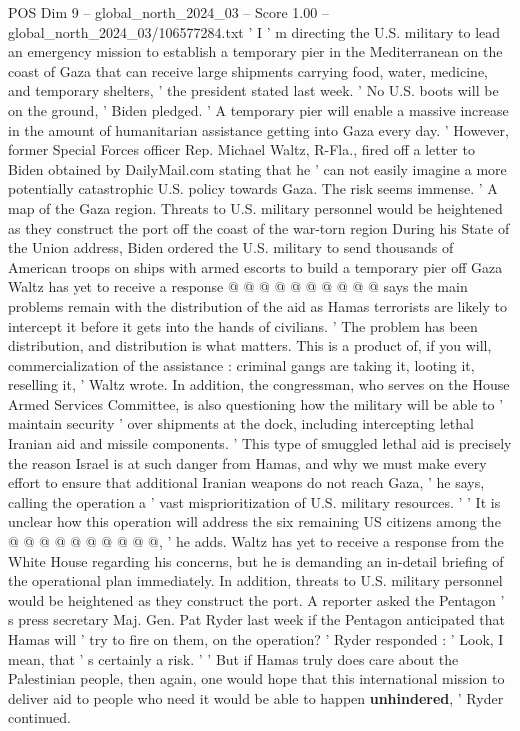 \begin{textsample}{POS Dim 9 – global\_north\_2024\_03 – Score 1.00 – global\_north\_2024\_03/106577284.txt}  \label{ex:f9_pos_276}
' I ' m directing the U.S. military to lead an emergency mission to establish a temporary pier in the Mediterranean on the coast of Gaza that can receive large shipments carrying food, water, medicine, and temporary shelters, ' the president stated last week. ' No U.S. boots will be on the ground, ' Biden pledged. ' A temporary pier will enable a massive increase in the amount of humanitarian assistance getting into Gaza every day. ' However, former Special Forces officer Rep.
Michael Waltz, R-Fla., fired off a letter to Biden obtained by DailyMail.com stating that he ' can not easily imagine a more potentially catastrophic U.S. policy towards Gaza.
The risk seems immense. ' A map of the Gaza region.
Threats to U.S. military personnel would be heightened as they construct the port off the coast of the war-torn region During his State of the Union address, Biden ordered the U.S. military to send thousands of American troops on ships with armed escorts to build a temporary pier off Gaza Waltz has yet to receive a response @ @ @ @ @ @ @ @ @ @ says the main problems remain with the distribution of the aid as Hamas terrorists are likely to intercept it before it gets into the hands of civilians. ' The problem has been distribution, and distribution is what matters.
This is a product of, if you will, commercialization of the assistance : criminal gangs are taking it, looting it, reselling it, ' Waltz wrote.
In addition, the congressman, who serves on the House Armed Services Committee, is also questioning how the military will be able to ' maintain security ' over shipments at the dock, including intercepting lethal Iranian aid and missile components. ' This type of smuggled lethal aid is precisely the reason Israel is at such danger from Hamas, and why we must make every effort to ensure that additional Iranian weapons do not reach Gaza, ' he says, calling the operation a ' vast misprioritization of U.S. military resources. ' ' It is unclear how this operation will address the six remaining US citizens among the @ @ @ @ @ @ @ @ @ @, ' he adds.
Waltz has yet to receive a response from the White House regarding his concerns, but he is demanding an in-detail briefing of the operational plan immediately.
In addition, threats to U.S. military personnel would be heightened as they construct the port.
A reporter asked the Pentagon ' s press secretary Maj.
Gen.
Pat Ryder last week if the Pentagon anticipated that Hamas will ' try to fire on them, on the operation? ' Ryder responded : ' Look, I mean, that ' s certainly a risk. ' ' But if Hamas truly does care about the Palestinian people, then again, one would hope that this international mission to deliver aid to people who need it would be able to happen \textbf{unhindered}, ' Ryder continued.

\end{textsample}
